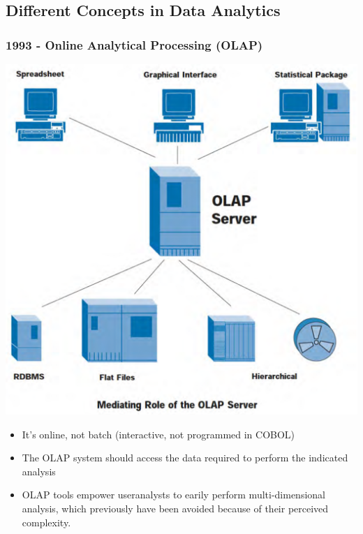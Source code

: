 \documentclass[a4paper]{article}
\begin{document}
		\subsection{Different Concepts in Data Analytics}
		
			\subsubsection{1993 - Online Analytical Processing (OLAP)}
			
			\begin{minipage}[c]{0.3\textwidth}
				\centering
				\includegraphics[width=\textwidth]{img/sw01/olap.png}
			\end{minipage}
			\hfill
			\begin{minipage}[c]{0.6\textwidth}
				\begin{itemize}
					\item It's online, not batch (interactive, not programmed in COBOL)
					\item The OLAP system should access the data required to perform the indicated analysis
					\item OLAP tools empower useranalysts to earily perform multi-dimensional analysis, which previously have been avoided because of their perceived complexity.
				\end{itemize}
			\end{minipage}
		
\end{document}

